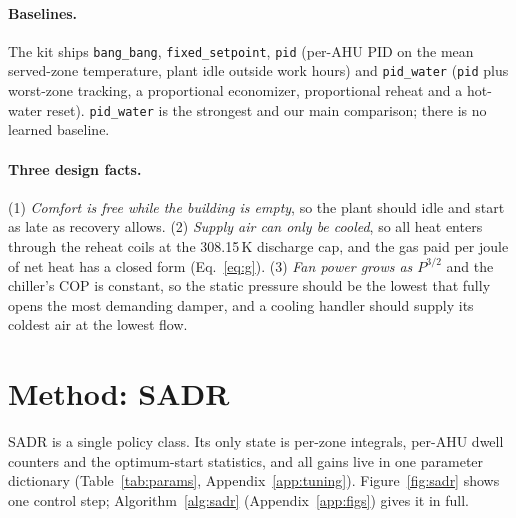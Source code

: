 \documentclass{article}
\begin{document}
\paragraph{Baselines.} The kit ships \texttt{bang\_bang}, \texttt{fixed\_setpoint}, \texttt{pid} (per-AHU PID on the mean served-zone temperature, plant idle outside work hours) and \texttt{pid\_water} (\texttt{pid} plus worst-zone tracking, a proportional economizer, proportional reheat and a hot-water reset). \texttt{pid\_water} is the strongest and our main comparison; there is no learned baseline.

\paragraph{Three design facts.} (1) \emph{Comfort is free while the building is empty}, so the plant should idle and start as late as recovery allows. (2) \emph{Supply air can only be cooled}, so all heat enters through the reheat coils at the 308.15\,K discharge cap, and the gas paid per joule of net heat has a closed form (Eq.~\ref{eq:g}). (3) \emph{Fan power grows as $P^{3/2}$} and the chiller's COP is constant, so the static pressure should be the lowest that fully opens the most demanding damper, and a cooling handler should supply its coldest air at the lowest flow.

\section{Method: SADR}
\label{sec:method}

SADR is a single policy class. Its only state is per-zone integrals, per-AHU dwell counters and the optimum-start statistics, and all gains live in one parameter dictionary (Table~\ref{tab:params}, Appendix~\ref{app:tuning}). Figure~\ref{fig:sadr} shows one control step; Algorithm~\ref{alg:sadr} (Appendix~\ref{app:figs}) gives it in full.
\end{document}

